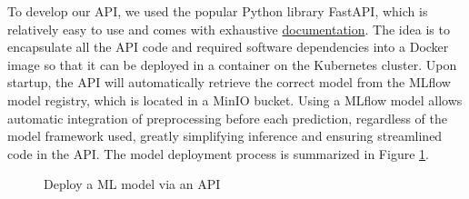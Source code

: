 To develop our API, we used the popular Python library FastAPI, which is relatively easy to use and comes with exhaustive \href{https://fastapi.tiangolo.com/}{documentation}. The idea is to encapsulate all the API code and required software dependencies into a Docker image so that it can be deployed in a container on the Kubernetes cluster. Upon startup, the API will automatically retrieve the correct model from the MLflow model registry, which is located in a MinIO bucket. Using a MLflow model allows automatic integration of preprocessing before each prediction, regardless of the model framework used, greatly simplifying inference and ensuring streamlined code in the API. The model deployment process is summarized in Figure \ref{fig:api-datalab}.

\begin{figure}[htbp]
    \centering
    \caption{Deploy a ML model via an API}
    \label{fig:api-datalab}
\end{figure}


